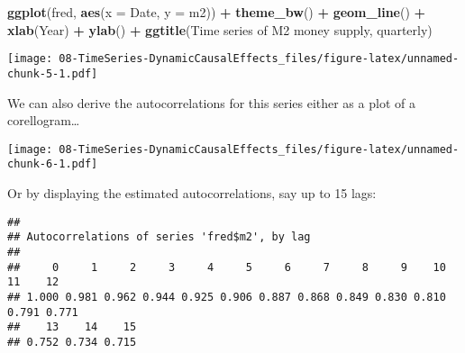 \documentclass[
]{article}
\newenvironment{Shaded}{\begin{snugshade}}{\end{snugshade}}
\newcommand{\AttributeTok}[1]{\textcolor[rgb]{0.13,0.29,0.53}{#1}}
\newcommand{\CommentTok}[1]{\textcolor[rgb]{0.56,0.35,0.01}{\textit{#1}}}
\newcommand{\ConstantTok}[1]{\textcolor[rgb]{0.56,0.35,0.01}{#1}}
\newcommand{\DecValTok}[1]{\textcolor[rgb]{0.00,0.00,0.81}{#1}}
\newcommand{\FunctionTok}[1]{\textcolor[rgb]{0.13,0.29,0.53}{\textbf{#1}}}
\newcommand{\NormalTok}[1]{#1}
\newcommand{\SpecialCharTok}[1]{\textcolor[rgb]{0.81,0.36,0.00}{\textbf{#1}}}
\newcommand{\StringTok}[1]{\textcolor[rgb]{0.31,0.60,0.02}{#1}}
\begin{document}
\begin{Shaded}
\begin{Highlighting}[]
\FunctionTok{ggplot}\NormalTok{(fred, }\FunctionTok{aes}\NormalTok{(}\AttributeTok{x =}\NormalTok{ Date, }\AttributeTok{y =}\NormalTok{ m2)) }\SpecialCharTok{+}
  \FunctionTok{theme\_bw}\NormalTok{() }\SpecialCharTok{+}
  \FunctionTok{geom\_line}\NormalTok{() }\SpecialCharTok{+}
  \FunctionTok{xlab}\NormalTok{(}\StringTok{\textquotesingle{}Year\textquotesingle{}}\NormalTok{) }\SpecialCharTok{+}
  \FunctionTok{ylab}\NormalTok{(}\StringTok{\textquotesingle{}\textquotesingle{}}\NormalTok{) }\SpecialCharTok{+}
  \FunctionTok{ggtitle}\NormalTok{(}\StringTok{\textquotesingle{}Time series of M2 money supply, quarterly\textquotesingle{}}\NormalTok{)}
\end{Highlighting}
\end{Shaded}

\texttt{[image: 08-TimeSeries-DynamicCausalEffects\_files/figure-latex/unnamed-chunk-5-1.pdf]}

We can also derive the autocorrelations for this series either as a plot
of a corellogram\ldots{}

\begin{Shaded}
\end{Shaded}

\texttt{[image: 08-TimeSeries-DynamicCausalEffects\_files/figure-latex/unnamed-chunk-6-1.pdf]}

Or by displaying the estimated autocorrelations, say up to 15 lags:

\begin{Shaded}
\end{Shaded}

\begin{verbatim}
## 
## Autocorrelations of series 'fred$m2', by lag
## 
##     0     1     2     3     4     5     6     7     8     9    10    11    12 
## 1.000 0.981 0.962 0.944 0.925 0.906 0.887 0.868 0.849 0.830 0.810 0.791 0.771 
##    13    14    15 
## 0.752 0.734 0.715
\end{verbatim}
\end{document}
